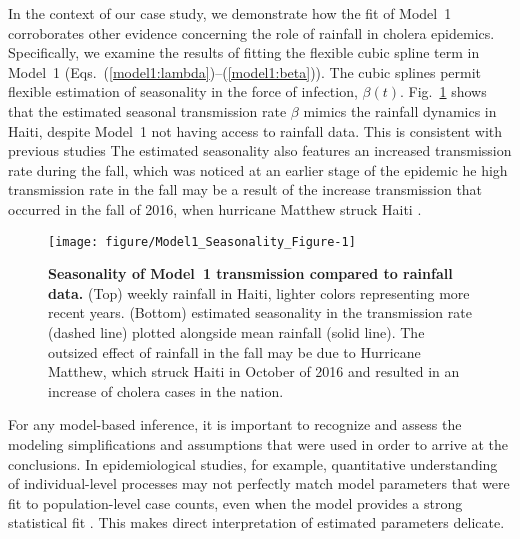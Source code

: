 \documentclass[10pt,letterpaper]{article}\usepackage[]{graphicx}\usepackage[table]{xcolor}
\makeatletter
\def\maxwidth{ %
  \ifdim\Gin@nat@width>\linewidth
    \linewidth
  \else
    \Gin@nat@width
  \fi
}
\newenvironment{knitrout}{}{} %
\newcommand\transmission{\beta}
\newcommand\figTitle{\bf}
\newcommand\myeqref[1]{(\ref{#1})}
\makeatother
\begin{document}
In the context of our case study, we demonstrate how the fit of Model~1 corroborates other evidence concerning the role of rainfall in cholera epidemics.
Specifically, we examine the results of fitting the flexible cubic spline term in Model~1 (Eqs.~\myeqref{model1:lambda}--\myeqref{model1:beta}).
The cubic splines permit flexible estimation of seasonality in the force of infection, $\transmission(t)$.
Fig.~\ref{fig:h1SeasRain} shows that the estimated seasonal transmission rate $\transmission$ mimics the rainfall dynamics in Haiti, despite Model~1 not having access to rainfall data.
This is consistent with previous studies  
The estimated seasonality also features an increased transmission rate during the fall, which was noticed at an earlier stage of the epidemic \cite{rinaldo12}he high transmission rate in the fall may  be a result of the increase transmission that occurred in the fall of 2016, when hurricane Matthew struck Haiti \cite{ferreirai16}.



\begin{figure}[!h]
\begin{knitrout}
\color{fgcolor}

{\centering \texttt{[image: figure/Model1\_Seasonality\_Figure-1]} 

}


\end{knitrout}
\caption{\label{fig:h1SeasRain}
{\figTitle Seasonality of Model~1 transmission compared to rainfall data.}
(Top) weekly rainfall in Haiti, lighter colors representing more recent years.
(Bottom) estimated seasonality in the transmission rate (dashed line) plotted alongside mean rainfall (solid line).
The outsized effect of rainfall in the fall may be due to Hurricane Matthew, which struck Haiti in October of 2016 and resulted in an increase of cholera cases in the nation.
}
\end{figure}

For any model-based inference, it is important to recognize and assess the modeling simplifications and assumptions that were used in order to arrive at the conclusions.
In epidemiological studies, for example, quantitative understanding of individual-level processes may not perfectly match model parameters that were fit to population-level case counts, even when the model provides a strong statistical fit \cite{he10}.
This makes direct interpretation of estimated parameters delicate.
\end{document}
